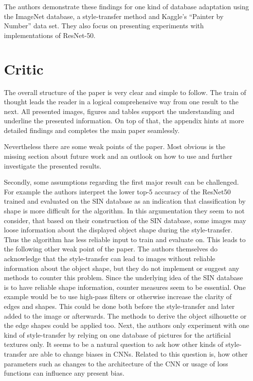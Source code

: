 \documentclass[runningheads,a4paper]{llncs}
\begin{document}
The authors demonstrate these findings for one kind of database adaptation using the ImageNet database, a style-transfer method and Kaggle's ``Painter by Number'' data set. They also focus on presenting experiments with implementations of ResNet-50.

\section{Critic}
The overall structure of the paper is very clear and simple to follow. The train of thought leads the reader in a logical comprehensive way from one result to the next. All presented images, figures and tables support the understanding and underline the presented information.
On top of that, the appendix hints at more detailed findings and completes the main paper seamlessly.

Nevertheless there are some weak points of the paper. Most obvious is the missing section about future work and an outlook on how to use and further investigate the presented results.

Secondly, some assumptions regarding the first major result can be challenged. For example the authors interpret the lower top-5 accuracy of the ResNet50 trained and evaluated on the SIN database as an indication that classification by shape is more difficult for the algorithm. In this argumentation they seem to not consider, that based on their construction of the SIN database, some images may loose information about the displayed object shape during the style-transfer. Thus the algorithm has less reliable input to train and evaluate on. This leads to the following other weak point of the paper. The authors themselves do acknowledge that the style-transfer can lead to images without reliable information about the object shape, but they do not implement or suggest any methods to counter this problem. Since the underlying idea of the SIN database is to have reliable shape information, counter measures seem to be essential. One example would be to use high-pass filters or otherwise increase the clarity of edges and shapes. This could be done both before the style-transfer and later added to the image or afterwards. The methods to derive the object silhouette or the edge shapes could be applied too.
Next, the authors only experiment with one kind of style-transfer by relying on one database of pictures for the artificial textures only. It seems to be a natural question to ask how other kinds of style-transfer are able to change biases in CNNs.
Related to this question is, how other parameters such as changes to the architecture of the CNN or usage of loss functions can influence any present bias.
\end{document}
